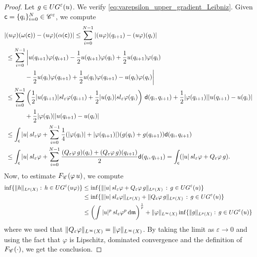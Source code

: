 \documentclass[12pt]{amsart}
\newcommand{\sfd}{{\sf d}}
\renewcommand{\d}{{\mathrm d}}
\newcommand{\X}{{\rm X}}
\newcommand{\mm}{\mathfrak m}
\newcommand{\F}{{\rm F}}
\theoremstyle{definition}
\newcommand{\sfc}{{\sf c}}
\newcommand{\Chain}[1]{\mathscr{C}^{#1}}
\renewcommand{\sl}[1]{{\rm sl}_{#1}}
\newcommand{\UG}[1]{{\rm UG}^{#1}}
\renewcommand{\F}[1]{{\rm F}_{{\rm #1}}}
\begin{document}
\begin{proof}
  Let $g \in {\rm UG}^\varepsilon(u)$. We verify \eqref{eq:varepsilon_upper_gradient_Leibniz}. Given $\sfc =\{ q_i\}_{i=0}^N \in \Chain{\varepsilon}$, we compute
  {\allowdisplaybreaks
  \begin{align}
      |&(u \varphi)(\omega(\sfc))- (u \varphi)(\alpha(\sfc))|  \le \sum_{i=0}^{N-1} |(u \varphi)(q_{i+1})- (u \varphi)(q_{i})|\\
      & \le \sum_{i=0}^{N-1} \bigg| u(q_{i+1})\varphi(q_{i+1}) -\frac{1}{2} u(q_{i+1})\varphi(q_{i}) + \frac{1}{2} u(q_{i+1})\varphi(q_{i}) \\
      &\qquad\quad-\frac{1}{2}u(q_{i}) \varphi(q_{i+1})+ \frac{1}{2}u(q_{i}) \varphi(q_{i+1}) - u(q_{i}) \varphi(q_{i}) \bigg| \\
      &\le \sum_{i=0}^{N-1} \left( \frac{1}{2}\vert u(q_{i+1}) \vert{\rm sl}_\varepsilon \varphi(q_{i+1}) + \frac{1}{2}\vert u(q_{i}) \vert{\rm sl}_\varepsilon \varphi(q_{i}) \right)\,\sfd(q_i,q_{i+1})+ \frac{1}{2}\vert \varphi(q_{i+1})\vert \vert u(q_{i+1})-u(q_{i}) \vert\\
      &\qquad\quad+ \frac{1}{2}\vert \varphi(q_{i}) \vert \vert u(q_{i+1})-u(q_{i}) \vert \\
      & \le \int_{\sfc} \vert u \vert\,{\rm sl}_{\varepsilon} \varphi + \sum_{i=0}^{N-1} \frac{1}{4} (\vert \varphi(q_{i})\vert + \vert\varphi(q_{i+1})\vert)(g(q_i)+g(q_{i+1}))\sfd(q_i,q_{i+1})\\
      & \le \int_{\sfc} \vert u \vert\,{\rm sl}_{\varepsilon} \varphi + \sum_{i=0}^{N-1} \frac{(Q_\varepsilon \varphi\, g)(q_i) + (Q_\varepsilon \varphi\, g)(q_{i+1})}{2}  \sfd(q_i,q_{i+1}) = \int_{\sfc} (\vert u \vert \,{\rm sl}_{\varepsilon} \varphi + Q_\varepsilon \varphi\, g).
  \end{align}
  }
  Now, to estimate $\F{\Chain{}}(\varphi\, u)$, we compute
  \begin{equation*}
  \begin{aligned}
      \inf \{ \|h\|_{L^p(\X)}:\, h \in {\rm UG}^\varepsilon(u \varphi)\} &\le \inf\{ \| |u|\,{\rm sl}_{\varepsilon} \varphi + Q_\varepsilon \varphi\, g \|_{L^p(\X)}\,:\, g\in \UG{\varepsilon}(u) \} \\
      &\le \inf\{ \| |u| \,{\rm sl}_{\varepsilon} \varphi \|_{L^p(\X)} + \| Q_\varepsilon \varphi\, g \|_{L^p(\X)}\,:\, g\in \UG{\varepsilon}(u) \}\\
      & \le \left(\int |u|^p\,\sl{\varepsilon}\varphi^p\,\d \mm\right)^{\frac{1}{p}} + \| \varphi \|_{L^\infty(\X)} \inf\{ \|g\|_{L^p(\X)}:\, g \in {\rm UG}^\varepsilon(u) \}\\
   \end{aligned}
  \end{equation*}
  where we used that $\|Q_\varepsilon \varphi\|_{L^\infty(\X)} =\|\varphi\|_{L^\infty(\X)}$.
  By taking the limit as $\varepsilon \to 0$ and using the fact that $\varphi$ is Lipschitz, dominated convergence and the definition of $\F{\Chain{}}(\cdot)$, we get the conclusion.
\end{proof}
\end{document}

